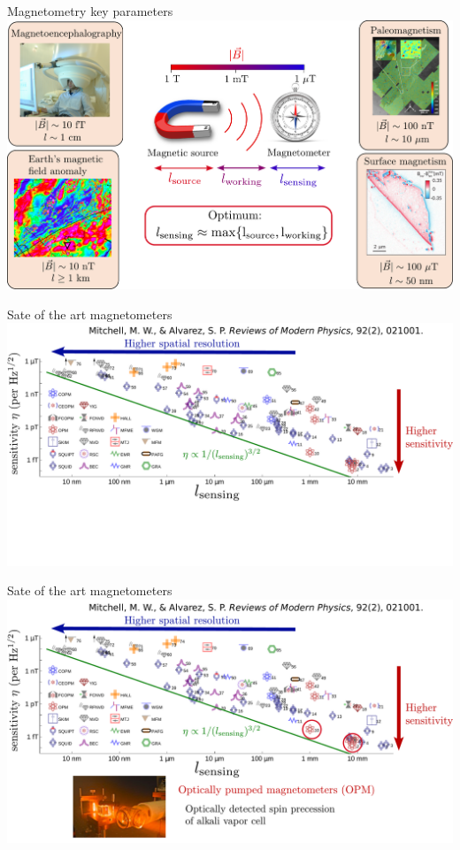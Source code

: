 \documentclass{beamer}
\begin{document}
\begin{frame}{Magnetometry key parameters}
\centering
\includegraphics[width=\textwidth,height=0.85\textheight,keepaspectratio]{Slide_magnetometer_size}
\end{frame}

\begin{frame}{Sate of the art magnetometers}
\centering
\includegraphics[width=\textwidth,height=0.85\textheight,keepaspectratio]{Slide_quantum_magnetometers_bare}
\end{frame}

\begin{frame}{Sate of the art magnetometers}
\centering
\includegraphics[width=\textwidth,height=0.85\textheight,keepaspectratio]{Slide_quantum_magnetometers_OPM}
\end{frame}
\end{document}
